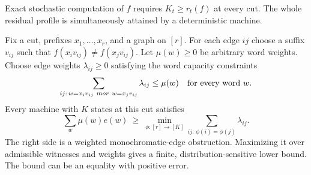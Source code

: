 \begin{theorem}
\label{thm:v20-weighted}
Exact stochastic computation of $f$ requires $K_t\ge r_t(f)$ at every
cut. The whole residual profile is simultaneously attained by a
deterministic machine.

Fix a cut, prefixes $x_1,\ldots,x_r$, and a graph on $[r]$. For each
edge $ij$ choose a suffix $v_{ij}$ such that
$f(x_iv_{ij})\ne f(x_jv_{ij})$. Let $\mu(w)\ge0$ be arbitrary word
weights. Choose edge weights $\lambda_{ij}\ge0$ satisfying the word
capacity constraints
\begin{equation}\label{eq:v20-congestion}
 \sum_{ij:\,w=x_iv_{ij}\ {
m or}\ w=x_jv_{ij}}\lambda_{ij}
 \le\mu(w)\quad\hbox{for every word }w.
\end{equation}
Every machine with $K$ states at this cut satisfies
\begin{equation}\label{eq:v20-graph}
 \sum_w\mu(w)e(w)\ \ge\
 \min_{\phi:[r]\to[K]}
       \sum_{ij:\,\phi(i)=\phi(j)}\lambda_{ij}.
\end{equation}
The right side is a weighted monochromatic-edge obstruction. Maximizing
it over admissible witnesses and weights gives a finite,
distribution-sensitive lower bound. The bound can be an equality with
positive error.
\end{theorem}
